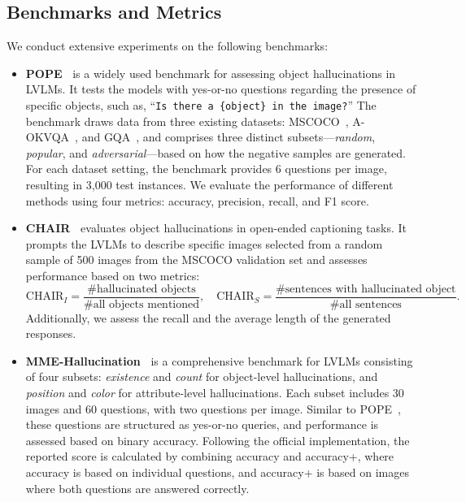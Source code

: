 \subsection{Benchmarks and Metrics}
We conduct extensive experiments on the following benchmarks:
\begin{itemize}
    \item {} \textbf{POPE~\citep{li2023evaluating}} is a widely used benchmark for assessing object hallucinations in LVLMs. It tests the models with yes-or-no questions regarding the presence of specific objects, such as, ``\texttt{Is there a \{object\} in the image?}'' The benchmark draws data from three existing datasets: MSCOCO~\citep{lin2014microsoft}, A-OKVQA~\citep{schwenk2022okvqa}, and GQA~\citep{hudson2019gqa}, and comprises three distinct subsets—\textit{random}, \textit{popular}, and \textit{adversarial}—based on how the negative samples are generated. For each dataset setting, the benchmark provides 6 questions per image, resulting in 3,000 test instances. We evaluate the performance of different methods using four metrics: accuracy, precision, recall, and F1 score.
    \item \textbf{CHAIR~\citep{rohrbach2018object}} evaluates object hallucinations in open-ended captioning tasks. It prompts the LVLMs to describe specific images selected from a random sample of 500 images from the MSCOCO validation set and assesses performance based on two metrics:
    \begin{equation}
    \label{eq:chair metrics}
        \text{CHAIR}_I =  \frac{\text{\# hallucinated objects}}{\text{\# all objects mentioned}}, \quad\text{CHAIR}_S =  \frac{\text{\# sentences with hallucinated object}}{\text{\# all sentences}}.
    \end{equation}
    Additionally, we assess the recall and the average length of the generated responses.
    \item \textbf{MME-Hallucination~\citep{fu2023mme}} is a comprehensive benchmark for LVLMs consisting of four subsets: \textit{existence} and \textit{count} for object-level hallucinations, and \textit{position} and \textit{color} for attribute-level hallucinations. Each subset includes 30 images and 60 questions, with two questions per image. Similar to POPE~\citep{li2023evaluating}, these questions are structured as yes-or-no queries, and performance is assessed based on binary accuracy. Following the official implementation, the reported score is calculated by combining accuracy and accuracy+, where accuracy is based on individual questions, and accuracy+ is based on images where both questions are answered correctly.

\end{itemize}
